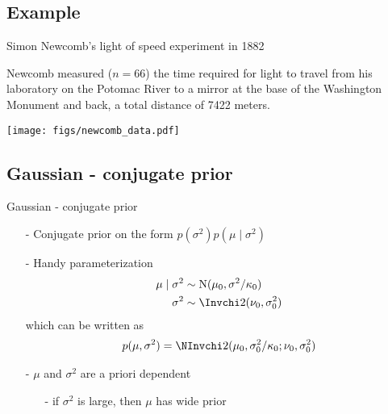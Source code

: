 \documentclass[10pt]{beamer}
\begin{document}
\subsection{Example}

\begin{frame}{Simon Newcomb's light of speed experiment in 1882}

  {\small
  Newcomb measured ($n=66$) the time required for light to travel from
  his laboratory on the Potomac River to a mirror at the base of the
  Washington Monument and back, a total distance of 7422 meters.}
  \begin{center}
    \vspace{-0.5\baselineskip}
    {\texttt{[image: figs/newcomb\_data.pdf]}}\\
    \vspace{-1\baselineskip}
  \end{center}

\end{frame}

\subsection{Gaussian - conjugate prior}

\begin{frame}{Gaussian - conjugate prior}

  \begin{itemize}
  \item[-] Conjugate prior on the form
    $p(\sigma^2)p(\mu \mid \sigma^2)$\\
    \pause
  \item[-] Handy parameterization
    \begin{align*}
      \mu \mid \sigma^2 & \sim \mathrm{N}(\mu_0,\sigma^2/\kappa_0)\\
      \sigma^2 & \sim \Invchi2(\nu_0,\sigma_0^2)
    \end{align*}
    which can be written as
    \begin{align*}
      p(\mu,\sigma^2)=\NInvchi2(\mu_0,\sigma_0^2/\kappa_0;\nu_0,\sigma_0^2)
    \end{align*}
    \pause
  \item[-] $\mu$ and $\sigma^2$ are a priori dependent
    \begin{itemize}
      \item[-] if $\sigma^2$ is large, then $\mu$ has wide prior
    \end{itemize}
  \end{itemize}

\end{frame}
\end{document}
